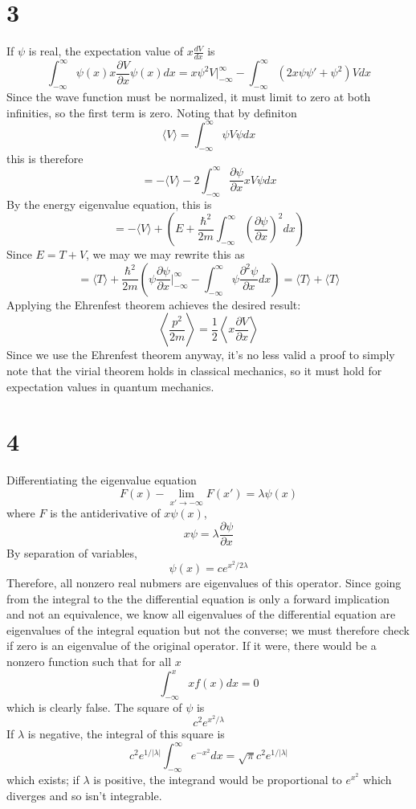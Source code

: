 \documentclass{article}
\begin{document}
\section*{3}
If $\psi$ is real, the expectation value of $x\frac{dV}{dx}$ is
\[\int_{-\infty}^{\infty}\psi(x)x\frac{\partial V}{\partial x}\psi(x)dx=x\psi^{2}V\bigg|_{-\infty}^{\infty}-\int_{-\infty}^{\infty}(2x\psi\psi'+\psi^{2})Vdx\]
Since the wave function must be normalized, it must limit to zero at both infinities, so the first term is zero. Noting that by definiton
\[\langle V \rangle=\int_{-\infty}^{\infty}\psi V \psi dx\]
this is therefore
\[=-\langle V \rangle-2\int_{-\infty}^{\infty}\frac{\partial\psi}{\partial x}xV\psi dx\]
By the energy eigenvalue equation, this is
\[=-\langle {V} \rangle+\left( E+\frac{\hbar^{2}}{2m}\int_{-\infty}^{\infty}\left( \frac{\partial \psi}{\partial x} \right)^{2}dx \right)\]
Since $E=T+V$, we may we may rewrite this as
\[=\langle T \rangle+\frac{\hbar^{2}}{2m}\left( \psi\frac{\partial \psi}{\partial x}\bigg|_{-\infty}^{\infty}-\int_{-\infty}^{\infty}\psi\frac{\partial ^{2 }\psi}{\partial x} dx\right)=\langle T \rangle+\langle  T \rangle\]
Applying the Ehrenfest theorem achieves the desired result:
\[\left\langle \frac{p^{2}}{2m} \right\rangle=\frac{1}{2}\left\langle x\frac{\partial V}{\partial x} \right\rangle\]
Since we use the Ehrenfest theorem anyway, it's no less valid a proof to simply note that the virial theorem holds in classical mechanics, so it must hold for expectation values in quantum mechanics.
\section*{4}
Differentiating the eigenvalue equation
\[F(x)-\lim_{x'\to -\infty}F(x')=\lambda\psi(x)\]
where $F$ is the antiderivative of $x\psi(x)$,
\[x\psi=\lambda\frac{\partial \psi}{\partial x} \]
By separation of variables,
\[\psi(x)=ce^{x^{2}/2\lambda}\]
Therefore, all nonzero real nubmers are eigenvalues of this operator. Since going from the integral to the the differential equation is only a forward implication and not an equivalence, we know all eigenvalues of the differential equation are eigenvalues of the integral equation but not the converse; we must therefore check if zero is an eigenvalue of the original operator. If it were, there would be a nonzero function such that for all $x$
\[\int_{-\infty}^{x}xf(x)dx=0\]
which is clearly false.
The square of $\psi$ is
\[c^{2}e^{x^{2}/\lambda}\]
If $\lambda$ is negative, the integral of this square is
\[c^{2}e^{1/|\lambda|}\int_{-\infty}^{\infty}e^{-x^{2}}dx=\sqrt{\pi}c^{2}e^{1/|\lambda|}\]
which exists; if $\lambda$ is positive, the integrand would be proportional to $e^{x^{2}}$ which diverges and so isn't integrable.
\end{document}
